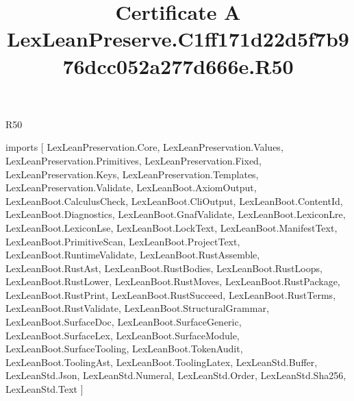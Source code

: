 \begin{lexlean}{R50}
\title{Certificate A LexLeanPreserve.C1ff171d22d5f7b976dcc052a277d666e.R50}
\begin{coremodule}
imports [
  LexLeanPreservation.Core,
  LexLeanPreservation.Values,
  LexLeanPreservation.Primitives,
  LexLeanPreservation.Fixed,
  LexLeanPreservation.Keys,
  LexLeanPreservation.Templates,
  LexLeanPreservation.Validate,
  LexLeanBoot.AxiomOutput,
  LexLeanBoot.CalculusCheck,
  LexLeanBoot.CliOutput,
  LexLeanBoot.ContentId,
  LexLeanBoot.Diagnostics,
  LexLeanBoot.GnafValidate,
  LexLeanBoot.LexiconLre,
  LexLeanBoot.LexiconLse,
  LexLeanBoot.LockText,
  LexLeanBoot.ManifestText,
  LexLeanBoot.PrimitiveScan,
  LexLeanBoot.ProjectText,
  LexLeanBoot.RuntimeValidate,
  LexLeanBoot.RustAssemble,
  LexLeanBoot.RustAst,
  LexLeanBoot.RustBodies,
  LexLeanBoot.RustLoops,
  LexLeanBoot.RustLower,
  LexLeanBoot.RustMoves,
  LexLeanBoot.RustPackage,
  LexLeanBoot.RustPrint,
  LexLeanBoot.RustSucceed,
  LexLeanBoot.RustTerms,
  LexLeanBoot.RustValidate,
  LexLeanBoot.StructuralGrammar,
  LexLeanBoot.SurfaceDoc,
  LexLeanBoot.SurfaceGeneric,
  LexLeanBoot.SurfaceLex,
  LexLeanBoot.SurfaceModule,
  LexLeanBoot.SurfaceTooling,
  LexLeanBoot.TokenAudit,
  LexLeanBoot.ToolingAst,
  LexLeanBoot.ToolingLatex,
  LexLeanStd.Buffer,
  LexLeanStd.Json,
  LexLeanStd.Numeral,
  LexLeanStd.Order,
  LexLeanStd.Sha256,
  LexLeanStd.Text
]


\end{coremodule}
\end{lexlean}
